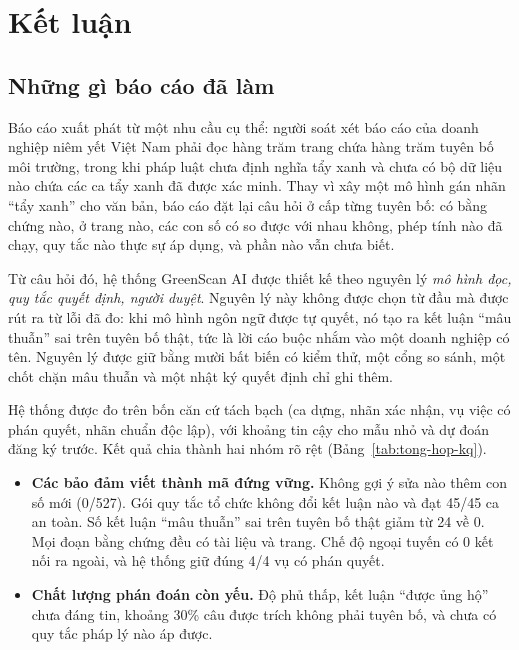 \chapter{Kết luận}\label{ch:ket-luan}

\section{Những gì báo cáo đã làm}

Báo cáo xuất phát từ một nhu cầu cụ thể: người soát xét báo cáo của doanh nghiệp niêm yết Việt Nam phải đọc hàng trăm trang chứa hàng trăm tuyên bố môi trường, trong khi pháp luật chưa định nghĩa tẩy xanh và chưa có bộ dữ liệu nào chứa các ca tẩy xanh đã được xác minh. Thay vì xây một mô hình gán nhãn “tẩy xanh” cho văn bản, báo cáo đặt lại câu hỏi ở cấp từng tuyên bố: có bằng chứng nào, ở trang nào, các con số có so được với nhau không, phép tính nào đã chạy, quy tắc nào thực sự áp dụng, và phần nào vẫn chưa biết.

Từ câu hỏi đó, hệ thống GreenScan AI được thiết kế theo nguyên lý \emph{mô hình đọc, quy tắc quyết định, người duyệt}. Nguyên lý này không được chọn từ đầu mà được rút ra từ lỗi đã đo: khi mô hình ngôn ngữ được tự quyết, nó tạo ra kết luận “mâu thuẫn” sai trên tuyên bố thật, tức là lời cáo buộc nhắm vào một doanh nghiệp có tên. Nguyên lý được giữ bằng mười bất biến có kiểm thử, một cổng so sánh, một chốt chặn mâu thuẫn và một nhật ký quyết định chỉ ghi thêm.

Hệ thống được đo trên bốn căn cứ tách bạch (ca dựng, nhãn xác nhận, vụ việc có phán quyết, nhãn chuẩn độc lập), với khoảng tin cậy cho mẫu nhỏ và dự đoán đăng ký trước. Kết quả chia thành hai nhóm rõ rệt (Bảng~\ref{tab:tong-hop-kq}).
\begin{itemize}
\item \textbf{Các bảo đảm viết thành mã đứng vững.} Không gợi ý sửa nào thêm con số mới (0/527). Gói quy tắc tổ chức không đổi kết luận nào và đạt 45/45 ca an toàn. Số kết luận “mâu thuẫn” sai trên tuyên bố thật giảm từ 24 về 0. Mọi đoạn bằng chứng đều có tài liệu và trang. Chế độ ngoại tuyến có 0 kết nối ra ngoài, và hệ thống giữ đúng 4/4 vụ có phán quyết.
\item \textbf{Chất lượng phán đoán còn yếu.} Độ phủ thấp, kết luận “được ủng hộ” chưa đáng tin, khoảng 30\% câu được trích không phải tuyên bố, và chưa có quy tắc pháp lý nào áp được.
\end{itemize}


